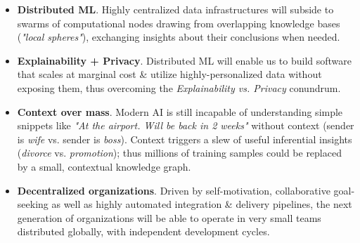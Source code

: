 \documentclass[a4paper]{twentysecondcv} %
\begin{document}
\begin{itemize}
	\item \textbf{Distributed ML}. Highly centralized data infrastructures will subside to swarms of computational nodes drawing from overlapping knowledge bases (\emph{"local spheres"}), exchanging insights about their conclusions when needed.

	\item \textbf{Explainability + Privacy}. Distributed ML will enable us to build software that scales at marginal cost \& utilize highly-personalized data without exposing them, thus overcoming the \textit{Explainability vs. Privacy} conundrum.

	\item \textbf{Context over mass}. Modern AI is still incapable of understanding simple snippets like \emph{"At the airport. Will be back in 2 weeks"}
	      without context (sender is \emph{wife} vs. sender is \emph{boss}). Context triggers a slew of useful inferential insights (\emph{divorce} vs. \emph{promotion});
	      thus millions of training samples could be replaced by a small, contextual knowledge graph.

	\item \textbf{Decentralized organizations}. Driven by self-motivation, collaborative goal-seeking as well as highly automated integration \& delivery pipelines, the next generation of organizations will be able to operate in very small teams distributed globally, with independent development cycles.



\end{itemize}



\end{document}
